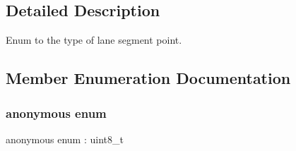 \subsection{Detailed Description}
Enum to the type of lane segment point. 

\subsection{Member Enumeration Documentation}
\mbox{\label{structmaf__perception__interface_1_1LaneSegmentPointEnum_aec11c68fd1ec024da5523f14e4bafac6}} 
\subsubsection{\texorpdfstring{anonymous enum}{anonymous enum}}
{\footnotesize\ttfamily anonymous enum \+: uint8\+\_\+t}


